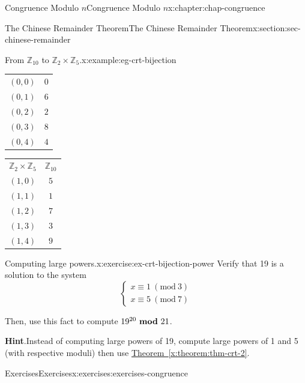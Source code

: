 \documentclass[oneside,10pt,]{book}
\newcommand{\blocktitlefont}{\relax}
\newcommand{\tabularfont}{\relax}
\newcommand{\xreffont}{\relax}
\numberwithin{equation}{section}
\newcommand{\Mod}[1]{\ \left(\mathrm{mod}\ #1\right)}
\newcommand{\mmod}[1]{\ \mathrm{\bf mod}\ #1}
\begin{document}
\begin{chapterptx}{Congruence Modulo \(n\)}{}{Congruence Modulo \(n\)}{}{}{x:chapter:chap-congruence}
\begin{sectionptx}{The Chinese Remainder Theorem}{}{The Chinese Remainder Theorem}{}{}{x:section:sec-chinese-remainder}
\begin{example}{From \(\mathbb{Z}_{10}\) to \(\mathbb{Z}_2 \times \mathbb{Z}_5\).}{x:example:eg-crt-bijection}
\begin{sidebyside}{2}{0.15}{0.15}{0.1}
\begin{sbspanel}{0.3}
{{\begin{tabular}{ll}
\multicolumn{1}{c}{\((0,0)\)}&\multicolumn{1}{c}{\(0\)}\tabularnewline[0pt]
\multicolumn{1}{c}{\((0,1)\)}&\multicolumn{1}{c}{\(6\)}\tabularnewline[0pt]
\multicolumn{1}{c}{\((0,2)\)}&\multicolumn{1}{c}{\(2\)}\tabularnewline[0pt]
\multicolumn{1}{c}{\((0,3)\)}&\multicolumn{1}{c}{\(8\)}\tabularnewline[0pt]
\multicolumn{1}{c}{\((0,4)\)}&\multicolumn{1}{c}{\(4\)}
\end{tabular}
}%
\par}
\end{sbspanel}%
\begin{sbspanel}{0.3}%
{\centering%
{\tabularfont%
\begin{tabular}{ll}
\multicolumn{1}{c}{\(\mathbb{Z}_2 \times \mathbb{Z}_5\)}&\multicolumn{1}{c}{\(\mathbb{Z}_{10}\)}\tabularnewline[0pt]
\multicolumn{1}{c}{\((1,0)\)}&\multicolumn{1}{c}{\(5\)}\tabularnewline[0pt]
\multicolumn{1}{c}{\((1,1)\)}&\multicolumn{1}{c}{\(1\)}\tabularnewline[0pt]
\multicolumn{1}{c}{\((1,2)\)}&\multicolumn{1}{c}{\(7\)}\tabularnewline[0pt]
\multicolumn{1}{c}{\((1,3)\)}&\multicolumn{1}{c}{\(3\)}\tabularnewline[0pt]
\multicolumn{1}{c}{\((1,4)\)}&\multicolumn{1}{c}{\(9\)}
\end{tabular}
}%
\par}
\end{sbspanel}%
\end{sidebyside}%
\end{example}
\begin{inlineexercise}{Computing large powers.}{x:exercise:ex-crt-bijection-power}%
Verify that 19 is a solution to the system%
\begin{equation*}
\begin{cases} x \equiv 1 \Mod{3} \\ x \equiv 5 \Mod{7}\end{cases}
\end{equation*}
%
\par
Then, use this fact to compute \(19^{20} \mmod{21}\).%
\par\smallskip%
\noindent\textbf{\blocktitlefont Hint}.\hypertarget{g:hint:id330466}{}\quad{}Instead of computing large powers of 19, compute large powers of 1 and 5 (with respective moduli) then use \hyperref[x:theorem:thm-crt-2]{Theorem~{\xreffont\ref{x:theorem:thm-crt-2}}}.%
\end{inlineexercise}
\end{sectionptx}
%
%
\typeout{************************************************}
\typeout{************************************************}
%
\begin{exercises-section}{Exercises}{}{Exercises}{}{}{x:exercises:exercises-congruence}

\end{exercises-section}
\end{chapterptx}
\end{document}
